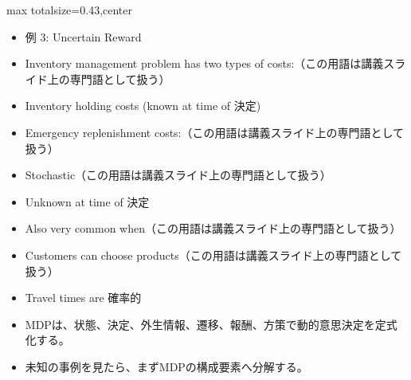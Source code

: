 \clearpage
{}
\begin{minipage}[t]{0.405\textwidth}
\begin{adjustbox}{max totalsize={\textwidth}{0.43\textheight},center}
\begin{minipage}{\textwidth}\scriptsize
{}\begin{itemize}
\item 例 3: Uncertain Reward
\item Inventory management problem has two types of costs:（この用語は講義スライド上の専門語として扱う）
\item Inventory holding costs (known at time of 決定)
\item Emergency replenishment costs:（この用語は講義スライド上の専門語として扱う）
\item Stochastic（この用語は講義スライド上の専門語として扱う）
\item Unknown at time of 決定
\item Also very common when（この用語は講義スライド上の専門語として扱う）
\item Customers can choose products（この用語は講義スライド上の専門語として扱う）
\item Travel times are 確率的
\end{itemize}\begin{itemize}
\item MDPは、状態、決定、外生情報、遷移、報酬、方策で動的意思決定を定式化する。
\item 未知の事例を見たら、まずMDPの構成要素へ分解する。
\end{itemize}
\end{minipage}
\end{adjustbox}
\end{minipage}\hfill
